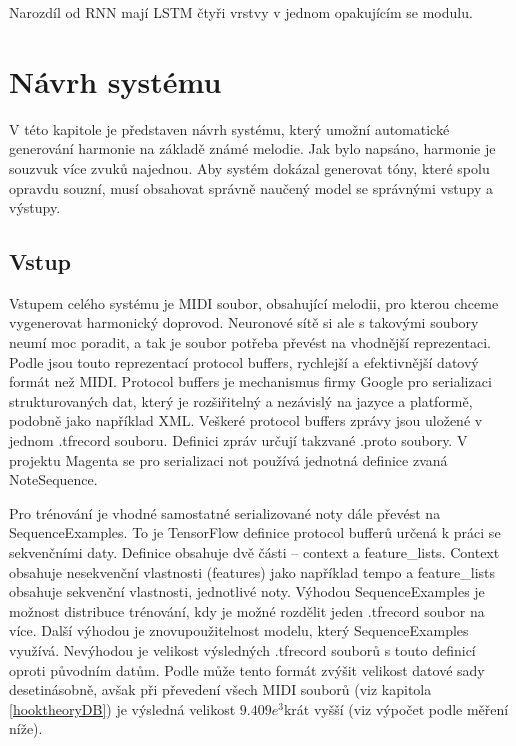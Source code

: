 Narozdíl od RNN mají LSTM čtyři vrstvy v jednom opakujícím se modulu.


\chapter{Návrh systému}
\label{navrhSystemu}
V této kapitole je představen návrh systému,
který umožní automatické generování harmonie na základě známé melodie.
Jak bylo napsáno, harmonie je souzvuk více zvuků najednou.
Aby systém dokázal generovat tóny, které spolu opravdu souzní,
musí obsahovat správně naučený model se správnými vstupy a výstupy.

\section{Vstup}
Vstupem celého systému je MIDI soubor, obsahující melodii,
pro kterou chceme vygenerovat harmonický doprovod.
Neuronové sítě si ale s takovými soubory neumí moc poradit,
a tak je soubor potřeba převést na vhodnější reprezentaci.
Podle \cite{google_git_polyphony} jsou touto reprezentací protocol buffers,
rychlejší a efektivnější datový formát než MIDI.
Protocol buffers je mechanismus firmy Google pro serializaci strukturovaných dat,
který je rozšiřitelný a nezávislý na jazyce a platformě, podobně jako například XML.
Veškeré protocol buffers zprávy jsou uložené v jednom .tfrecord souboru.
Definici zpráv určují takzvané .proto soubory.\cite{google_ProtocolBuffers}
V projektu Magenta se pro serializaci not používá jednotná definice zvaná NoteSequence.
\cite{google_musicColab}
\par

Pro trénování je vhodné samostatné serializované noty dále převést na SequenceExamples.
\cite{google_git_polyphony}
To je TensorFlow definice protocol bufferů určená k práci se sekvenčními daty.
Definice obsahuje dvě části -- context a feature\_lists.
Context obsahuje nesekvenční vlastnosti (features) jako například tempo a 
feature\_lists obsahuje sekvenční vlastnosti, jednotlivé noty.
Výhodou SequenceExamples je možnost distribuce trénování, 
kdy je možné rozdělit jeden .tfrecord soubor na více.
Další výhodou je znovupoužitelnost modelu, který SequenceExamples využívá.
Nevýhodou je velikost výsledných .tfrecord souborů s touto definicí oproti původním datům. 
\cite{britz_undocumentedFeatures}
Podle \cite{britz_undocumentedFeatures} může tento formát zvýšit velikost datové sady desetinásobně,
avšak při převedení všech MIDI souborů (viz kapitola \ref{hooktheoryDB}) 
je výsledná velikost $9.409e^3$krát vyšší (viz výpočet podle měření níže).

